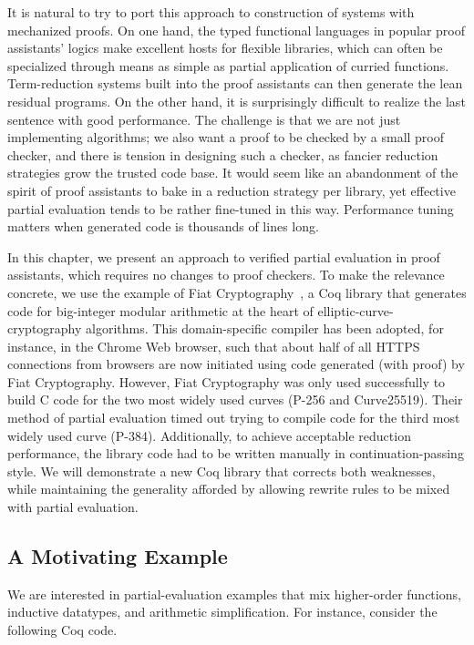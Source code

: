 It is natural to try to port this approach to construction of systems with mechanized proofs.
On one hand, the typed functional languages in popular proof assistants' logics make excellent hosts for flexible libraries, which can often be specialized through means as simple as partial application of curried functions.
Term-reduction systems built into the proof assistants can then generate the lean residual programs.
On the other hand, it is surprisingly difficult to realize the last sentence with good performance.
The challenge is that we are not just implementing algorithms; we also want a proof to be checked by a small proof checker, and there is tension in designing such a checker, as fancier reduction strategies grow the trusted code base.
It would seem like an abandonment of the spirit of proof assistants to bake in a reduction strategy per library, yet effective partial evaluation tends to be rather fine-tuned in this way.
Performance tuning matters when generated code is thousands of lines long.

In this chapter, we present an approach to verified partial evaluation in proof assistants, which requires no changes to proof checkers.
To make the relevance concrete, we use the example of Fiat Cryptography~\cite{FiatCryptoSP19}, a Coq library that generates code for big-integer modular arithmetic at the heart of elliptic-curve-cryptography algorithms.
This domain-specific compiler has been adopted, for instance, in the Chrome Web browser, such that about half of all HTTPS connections from browsers are now initiated using code generated (with proof) by Fiat Cryptography.
However, Fiat Cryptography was only used successfully to build C code for the two most widely used curves (P-256 and Curve25519).
Their method of partial evaluation timed out trying to compile code for the third most widely used curve (P-384).
Additionally, to achieve acceptable reduction performance, the library code had to be written manually in continuation-passing style.
We will demonstrate a new Coq library that corrects both weaknesses, while maintaining the generality afforded by allowing rewrite rules to be mixed with partial evaluation.

\subsection{A Motivating Example}\label{sec:motivating-example}\label{sec:explain-ident.eagerly}\label{sec:explain-eval-rect}\label{sec:explain-'}

We are interested in partial-evaluation examples that mix higher-order functions, inductive datatypes, and arithmetic simplification.
For instance, consider the following Coq code.


